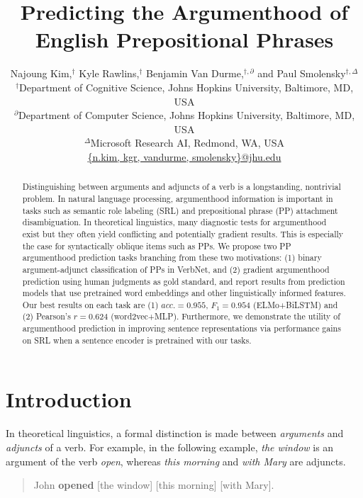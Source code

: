 \documentclass[letterpaper]{article} %
\title{Predicting the Argumenthood of English Prepositional Phrases}
\author{Najoung Kim,$^\dagger$ Kyle Rawlins,$^\dagger$ Benjamin Van Durme,$^{\dagger,\partial}$ and Paul Smolensky$^{\dagger,\Delta}$\\
$^\dagger$Department of Cognitive Science, Johns Hopkins University, Baltimore, MD, USA\\
$^\partial$Department of Computer Science, Johns Hopkins University, Baltimore, MD, USA \\
$^\Delta$Microsoft Research AI, Redmond, WA, USA\\
\url{{n.kim, kgr, vandurme, smolensky}@jhu.edu}}
\begin{document}
\maketitle
\begin{abstract}
Distinguishing between arguments and adjuncts of a verb is a longstanding, nontrivial problem. In natural language processing, argumenthood information is important in tasks such as semantic role labeling (SRL) and prepositional phrase (PP) attachment disambiguation. In theoretical linguistics, many diagnostic tests for argumenthood exist but they often yield conflicting and potentially gradient results. This is especially the case for syntactically oblique items such as PPs. We propose two PP argumenthood prediction tasks branching from these two motivations: (1) binary argument-adjunct classification of PPs in VerbNet, and (2) gradient argumenthood prediction using human judgments as gold standard, and report results from prediction models that use pretrained word embeddings and other linguistically informed features. Our best results on each task are (1) $acc.=0.955$, $F_1=0.954$ (ELMo+BiLSTM) and (2) Pearson's $r=0.624$ (word2vec+MLP). Furthermore, we demonstrate the utility of argumenthood prediction in improving sentence representations via performance gains on SRL when a sentence encoder is pretrained with our tasks.
\end{abstract}

\section{Introduction}

In theoretical linguistics, a formal distinction is made between \textit{arguments} and \textit{adjuncts} of a verb. For example, in the following example, \textit{the window} is an argument of the verb \textit{open}, whereas \textit{this morning} and \textit{with Mary} are adjuncts.

\begin{quote}
	John \textbf{opened} [the window] [this morning] [with Mary].
\end{quote}
\end{document}

